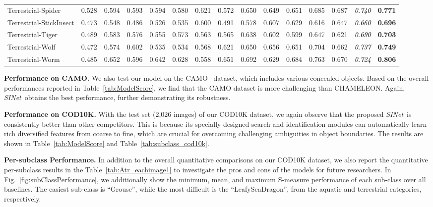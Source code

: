 \documentclass[10pt,journal,compsoc]{IEEEtran}
\newcommand{\myPara}[1]{\vspace{6pt}\noindent\textbf{#1}\qquad }
\newcommand{\figref}[1]{Fig.~\ref{#1}}
\newcommand{\tabref}[1]{Table~\ref{#1}}
\newcommand{\Rev}[1]{\textcolor{black}{#1}}
\def\ournewmodel{\emph{SINet}}
\begin{document}
\begin{table*}[thp!]
\begin{tabular}{l | ccccc ccccc cccc}
Terrestrial-Spider &0.528 &0.594 &0.593 &0.594 &0.580 &0.621 &0.572 &0.650 &0.649 &0.651 &0.685 &0.687 & \Rev{\textit{0.740}} &\textbf{0.771}\\
\rowcolor{mygray}
Terrestrial-StickInsect &0.473 &0.548 &0.486 &0.526 &0.535 &0.600 &0.491 &0.578 &0.607 &0.629 &0.616 &0.647 & \Rev{\textit{0.660}} &\textbf{0.696}\\
Terrestrial-Tiger &0.489 &0.583 &0.576 &0.555 &0.573 &0.563 &0.565 &0.638 &0.602 &0.599 &0.647 &0.621 & \Rev{\textit{0.690}} &\textbf{0.703}\\
\rowcolor{mygray}
Terrestrial-Wolf &0.472 &0.574 &0.602 &0.535 &0.534 &0.568 &0.621 &0.650 &0.656 &0.651 &0.704 &0.662 & \Rev{\textit{0.737}} &\textbf{0.749}\\
Terrestrial-Worm &0.485 &0.652 &0.596 &0.642 &0.628 &0.558 &0.651 &0.692 &0.629 &0.684 &0.763 &0.670 & \Rev{\textit{0.724}} &\textbf{0.806}\\

  \bottomrule
  \end{tabular}
\end{table*}


\myPara{Performance on CAMO.}
We also test our model on the CAMO~\cite{le2019anabranch} dataset, 
which includes various concealed objects.
Based on the overall performances reported in \tabref{tab:ModelScore}, 
we find that the CAMO dataset is more challenging than CHAMELEON.
Again, \ournewmodel~obtains the best performance, 
further demonstrating its robustness.


\myPara{Performance on COD10K.}
With the test set (2,026 images) of our COD10K dataset, 
we again observe that the proposed \ournewmodel~is consistently 
better than other competitors.
This is because its specially designed search and identification modules 
can automatically learn rich diversified features from coarse to fine, 
which are crucial for overcoming challenging ambiguities in object boundaries.
The results are shown in \tabref{tab:ModelScore} and 
\tabref{tab:subclass_cod10k}.

\myPara{Per-subclass Performance.}
In addition to the overall quantitative comparisons on our COD10K dataset, 
we also report the quantitative per-subclass results in the 
\tabref{tab:Atr_eachimage1} to investigate the pros and cons of the models 
for future researchers.
In \figref{fig:subClassPerformance}, we additionally show the minimum, mean, 
and maximum S-measure performance of each sub-class over all baselines.
The \Rev{easiest} sub-class is ``Grouse'', 
while the most difficult is the ``LeafySeaDragon'', 
from the aquatic and terrestrial categories, respectively.
\end{document}
